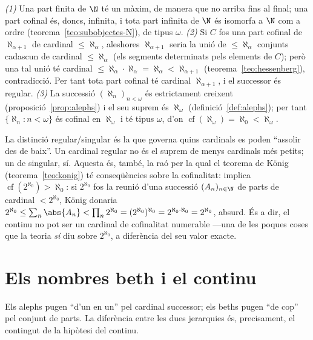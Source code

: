\begin{prova}
\emph{(1)} Una part finita de \(\N\) té un màxim, de manera que no arriba fins al
final; una part cofinal és, doncs, infinita, i tota part infinita de \(\N\)
és isomorfa a \(\N\) com a ordre (teorema~\ref{teo:subobjectes-N}), de tipus
\(\omega\).
\emph{(2)} Si \(C\) fos una part cofinal de \(\aleph_{\alpha+1}\) de cardinal
\(\le\aleph_\alpha\), aleshores \(\aleph_{\alpha+1}\) seria la unió de \(\le\aleph_\alpha\)
conjunts cadascun de cardinal \(\le\aleph_\alpha\) (els segments determinats pels
elements de \(C\)); però una tal unió té cardinal \(\le\aleph_\alpha\cdot\aleph_\alpha=\aleph_\alpha<\aleph_{\alpha+1}\)
(teorema~\ref{teo:hessenberg}), contradicció.
Per tant tota part cofinal té cardinal \(\aleph_{\alpha+1}\), i el successor és
regular. \emph{(3)} La successió \((\aleph_n)_{n<\omega}\) és estrictament
creixent (proposició~\ref{prop:alephs}) i el seu suprem és \(\aleph_\omega\)
(definició~\ref{def:alephs}); per tant \(\{\aleph_n:n<\omega\}\) és cofinal en
\(\aleph_\omega\) i té tipus \(\omega\), d'on \(\operatorname{cf}(\aleph_\omega)=\aleph_0<\aleph_\omega\).
\end{prova}

\begin{observacio}\label{obs:cofinalitat-importa}
La distinció regular\slash singular és la que governa quins cardinals es poden
\enquote{assolir des de baix}. Un cardinal regular no és el suprem de menys
cardinals més petits; un de singular, sí. Aquesta és, també, la raó per la qual
el teorema de König (teorema~\ref{teo:konig}) té conseqüències sobre la
cofinalitat: implica \(\operatorname{cf}(2^{\aleph_0})>\aleph_0\): si \(2^{\aleph_0}\) fos la
reunió d'una successió \((A_n)_{n\in\N}\) de parts de cardinal
\(<2^{\aleph_0}\), König donaria
\(2^{\aleph_0}\le\sum_n\abs{A_n}<\prod_n2^{\aleph_0}=(2^{\aleph_0})^{\aleph_0}=2^{\aleph_0\cdot\aleph_0}=2^{\aleph_0}\),
absurd. És a dir, el continu no pot ser un cardinal de cofinalitat numerable ---una de les
poques coses que la teoria \emph{sí} diu sobre \(2^{\aleph_0}\), a diferència del
seu valor exacte.
\end{observacio}

\section{Els nombres beth i el continu}\label{sec:beths-continu}

Els alephs pugen \enquote{d'un en un} pel cardinal successor; els beths pugen
\enquote{de cop} pel conjunt de parts. La diferència entre les dues jerarquies
és, precisament, el contingut de la hipòtesi del continu.

